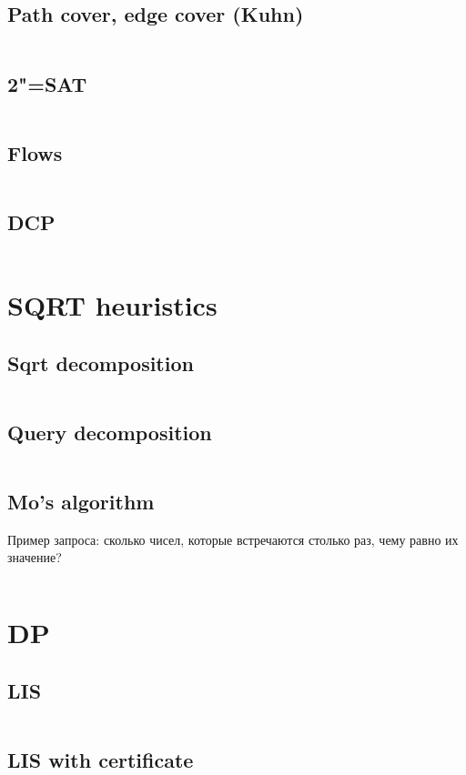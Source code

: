 ﻿\documentclass[a4paper,10pt,twocolumn,oneside]{article}
\begin{document}
\subsection{Path cover, edge cover (Kuhn)}
\inputminted[breaklines]{cpp}{Graph algorithms/path cover + edge cover (kuhn).cpp}
\subsection{2"=SAT}
\inputminted[breaklines]{cpp}{Graph algorithms/2-sat.cpp}
\subsection{Flows}
\inputminted[breaklines]{cpp}{Graph algorithms/flows.cpp}
\subsection{DCP}
\inputminted[breaklines]{cpp}{Graph algorithms/dcp.cpp}

\section{SQRT heuristics}
\subsection{Sqrt decomposition}
\inputminted[breaklines]{python}{SQRT heuristics/sqrt decomposition.py}
\subsection{Query decomposition}
\inputminted[breaklines]{cpp}{SQRT heuristics/query decomposition.cpp}
\subsection{Mo's algorithm}
Пример запроса: сколько чисел, которые встречаются столько раз, чему равно их значение?
\inputminted[breaklines]{cpp}{SQRT heuristics/mo's algorithm.cpp}

\section{DP}
\subsection{LIS}
\inputminted[breaklines]{cpp}{DP/lis.cpp}
\subsection{LIS with certificate}
\inputminted[breaklines]{cpp}{DP/lis with certificate.cpp}
\end{document}

